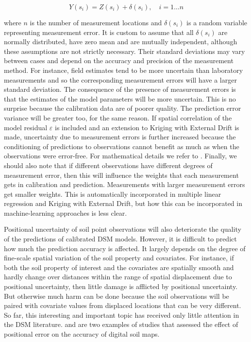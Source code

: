 \documentclass[10pt,b5paper,]{book}
\theoremstyle{definition}
\theoremstyle{definition}
\theoremstyle{definition}
\theoremstyle{remark}
\begin{document}
\begin{equation}
Y(s_i) = Z(s_i) + \delta(s_i), \quad i = 1 \dots n
\end{equation}

where \(n\) is the number of measurement locations and \({\delta(s_i)}\)
is a random variable representing measurement error. It is custom to
assume that all \({\delta(s_i)}\) are normally distributed, have zero
mean and are mutually independent, although these assumptions are not
strictly necessary. Their standard deviations may vary between cases and
depend on the accuracy and precision of the measurement method. For
instance, field estimates tend to be more uncertain than laboratory
measurements and so the corresponding measurement errors will have a
larger standard deviation. The consequence of the presence of
measurement errors is that the estimates of the model parameters will be
more uncertain. This is no surprise because the calibration data are of
poorer quality. The prediction error variance will be greater too, for
the same reason. If spatial correlation of the model residual
\({\varepsilon}\) is included and an extension to Kriging with External
Drift is made, uncertainty due to measurement errors is further
increased because the conditioning of predictions to observations cannot
benefit as much as when the observations were error-free. For
mathematical details we refer to \cite{cressie1993statistics}. Finally,
we should also note that if different observations have different
degrees of measurement error, then this will influence the weights that
each measurement gets in calibration and prediction. Measurements with
larger measurement errors get smaller weights. This is automatically
incorporated in multiple linear regression and Kriging with External
Drift, but how this can be incorporated in machine-learning approaches
is less clear.

Positional uncertainty of soil point observations will also deteriorate
the quality of the predictions of calibrated DSM models. However, it is
difficult to predict how much the prediction accuracy is affected. It
largely depends on the degree of fine-scale spatial variation of the
soil property and covariates. For instance, if both the soil property of
interest and the covariates are spatially smooth and hardly change over
distances within the range of spatial displacement due to positional
uncertainty, then little damage is afflicted by positional uncertainty.
But otherwise much harm can be done because the soil observations will
be paired with covariate values from displaced locations that can be
very different. So far, this interesting and important topic has
received only little attention in the DSM literature.
\cite{grimm2010uncertainty} and \cite{nelson2011error} are two examples
of studies that assessed the effect of positional error on the accuracy
of digital soil maps.
\end{document}
